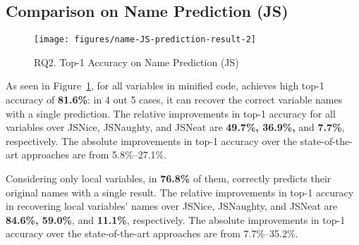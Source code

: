 \subsection{{\bf Comparison on Name Prediction (JS)}}
\label{empirical-rq-js}

\begin{figure}[t] %
\begin{center}
\texttt{[image: figures/name-JS-prediction-result-2]} %
\vspace{-8pt}
\caption{RQ2. Top-1 Accuracy on Name Prediction (JS)}
\label{name-JS-prediction-result}
\end{center}
\end{figure}

As seen in Figure~\ref{name-JS-prediction-result}, for all variables in
minified code, {\tool} achieves high top-1 accuracy of {\bf 81.6\%}:
in 4 out 5 cases, it can recover the correct variable names
with a single prediction. The relative improvements in top-1 accuracy
for all variables over JSNice, JSNaughty, and JSNeat are
{\bf 49.7\%, 36.9\%,} and {\bf 7.7\%},
respectively.  The absolute improvements in top-1 accuracy over the
state-of-the-art approaches are from 5.8\%--27.1\%.

Considering only local variables, in
{\bf 76.8\%} of them, {\tool} correctly predicts their original names
with a single result. The relative improvements in top-1 accuracy in
recovering local variables' names over JSNice, JSNaughty, and JSNeat
are
{\bf 84.6\%, 59.0\%}, and {\bf 11.1\%}, respectively. The absolute
improvements in top-1 accuracy over the state-of-the-art approaches
are from 7.7\%--35.2\%.

